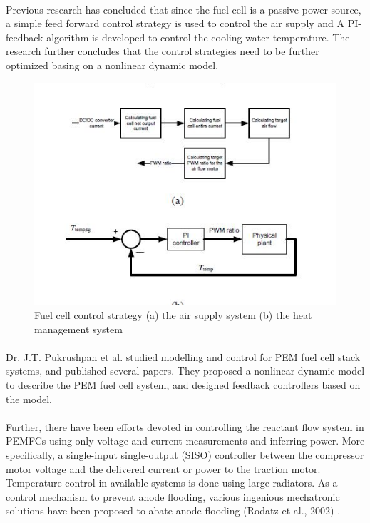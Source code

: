 \paragraph{}Previous research has concluded that since the fuel cell is a passive power source, a simple feed forward control strategy is used to control the air supply and A PI-feedback algorithm is developed to control the cooling water temperature. The research further concludes that the control strategies need to be further optimized basing on a nonlinear dynamic model.
\begin{figure}[!h]
\includegraphics{Figures/Figure8}
\caption{Fuel cell control strategy (a) the air supply system (b) the heat management system
\cite{xu_hierarchical_2010}}
\end{figure}

\paragraph{}Dr. J.T. Pukrushpan et al.\cite{pukrushpan_modeling_2003} studied modelling and control for PEM fuel cell stack
systems, and published several papers. They proposed a nonlinear dynamic model to describe
the PEM fuel cell system, and designed feedback controllers based on the model.
\paragraph{}Further, there have been efforts devoted in controlling the reactant flow system in PEMFCs using only voltage and current measurements and inferring power. More specifically, a single-input
single-output (SISO) controller between the compressor motor voltage and the delivered current or power to the traction motor. Temperature control in available systems is done using large radiators. As a control mechanism to prevent anode flooding, various ingenious mechatronic solutions have been proposed to abate anode flooding (Rodatz et al., 2002)
 \cite{stefanopoulou_mechatronics_nodate}.
